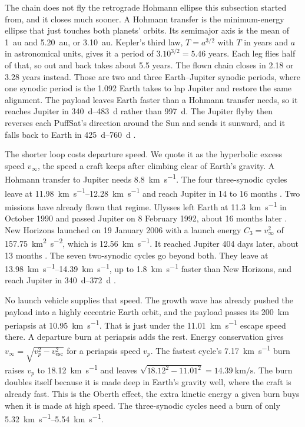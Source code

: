 \documentclass{article}
\begin{document}
The chain does not fly the retrograde Hohmann ellipse this subsection started from, and it closes much sooner. A Hohmann transfer is the minimum-energy ellipse that just touches both planets' orbits. Its semimajor axis is the mean of \SI{1}{\astronomicalunit} and \SI{5.20}{\astronomicalunit}, or \SI{3.10}{\astronomicalunit}. Kepler's third law, $T = a^{3/2}$ with $T$ in years and $a$ in astronomical units, gives it a period of $3.10^{3/2} = 5.46$ years. Each leg flies half of that, so out and back takes about 5.5 years. The flown chain closes in 2.18 or 3.28 years instead. Those are two and three Earth--Jupiter synodic periods, where one synodic period is the \SI{1.092}{\year} Earth takes to lap Jupiter and restore the same alignment. The payload leaves Earth faster than a Hohmann transfer needs, so it reaches Jupiter in \SIrange{340}{483}{\day} rather than \SI{997}{\day}. The Jupiter flyby then reverses each PuffSat's direction around the Sun and sends it sunward, and it falls back to Earth in \SIrange{425}{760}{\day} \cite{Katz_aim_is_all_you_need_2025}.

The shorter loop costs departure speed. We quote it as the hyperbolic excess speed $v_\infty$, the speed a craft keeps after climbing clear of Earth's gravity. A Hohmann transfer to Jupiter needs \SI{8.8}{\kilo\meter\per\second}. The four three-synodic cycles leave at \SIrange{11.98}{12.28}{\kilo\meter\per\second} and reach Jupiter in 14 to 16 months \cite{Katz_aim_is_all_you_need_2025}. Two missions have already flown that regime. Ulysses left Earth at \SI{11.3}{\kilo\meter\per\second} in October 1990 and passed Jupiter on 8 February 1992, about 16 months later \cite{marsden1992ulysses_jupiter}. New Horizons launched on 19 January 2006 with a launch energy $C_3 = v_\infty^2$ of \SI{157.75}{\kilo\meter\squared\per\second\squared}, which is \SI{12.56}{\kilo\meter\per\second}. It reached Jupiter 404 days later, about 13 months \cite{guo2008newhorizons_design}. The seven two-synodic cycles go beyond both. They leave at \SIrange{13.98}{14.39}{\kilo\meter\per\second}, up to \SI{1.8}{\kilo\meter\per\second} faster than New Horizons, and reach Jupiter in \SIrange{340}{372}{\day} \cite{Katz_aim_is_all_you_need_2025}.

No launch vehicle supplies that speed. The growth wave has already pushed the payload into a highly eccentric Earth orbit, and the payload passes its \SI{200}{\kilo\meter} periapsis at \SI{10.95}{\kilo\meter\per\second}. That is just under the \SI{11.01}{\kilo\meter\per\second} escape speed there. A departure burn at periapsis adds the rest. Energy conservation gives $v_\infty = \sqrt{v_p^2 - v_{\mathrm{esc}}^2}$ for a periapsis speed $v_p$. The fastest cycle's \SI{7.17}{\kilo\meter\per\second} burn raises $v_p$ to \SI{18.12}{\kilo\meter\per\second} and leaves $\sqrt{18.12^2 - 11.01^2} = \SI{14.39}{\kilo\meter\per\second}$. The burn doubles itself because it is made deep in Earth's gravity well, where the craft is already fast. This is the Oberth effect, the extra kinetic energy a given burn buys when it is made at high speed. The three-synodic cycles need a burn of only \SIrange{5.32}{5.54}{\kilo\meter\per\second}.
\end{document}
